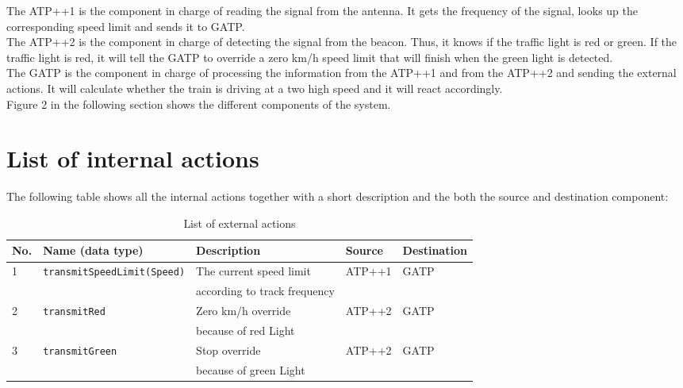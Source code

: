\documentclass[11pt,a4paper]{article}
\newcommand{\transmitSpeedLimit}[1]{\texttt{transmitSpeedLimit(#1)} }
\newcommand{\transmitRed}{\texttt{transmitRed} }
\newcommand{\transmitGreen}{\texttt{transmitGreen} }
\begin{document}
The ATP++1 is the component in charge of reading the signal from the antenna. It gets the frequency of the signal, looks up the corresponding speed limit and sends it to GATP. \\


The ATP++2 is the component in charge of detecting the signal from the beacon. Thus, it knows if the traffic light is red or green. If the traffic light is red, it will tell the GATP to override a zero km/h speed limit that will finish when the green light is detected. \\


The GATP is the component in charge of processing the information from the ATP++1 and from the ATP++2 and sending the external actions. It will calculate whether the train is driving at a two high speed and it will react accordingly. \\

Figure 2 in the following section shows the different components of the system.



\newpage


\section{List of internal actions}

The following table shows all the internal actions together with a short description and the both the source and destination component:


\begin{table}[!hbp]
	\centering
	\begin{adjustwidth}{-2.3cm}{}
	\begin{tabular}{|l|l|l|l|l|}
		
		\hline
		\textbf{No.} & \textbf{Name (data type)} & \textbf{Description} & \textbf{Source} & \textbf{Destination} \\
		\hline
		1 & \transmitSpeedLimit{Speed} & The current speed limit & ATP++1 & GATP\\
		  & & according to track frequency & & \\
		\hline
		2 & \transmitRed & Zero km/h override  & ATP++2 & GATP\\
			& & because of red Light & & \\
		\hline
		3 & \transmitGreen & Stop override & ATP++2 & GATP \\
			& & because of green Light & & \\
		\hline		
	\end{tabular}
	\end{adjustwidth}
	\caption{List of external actions}
\end{table}
\end{document}
